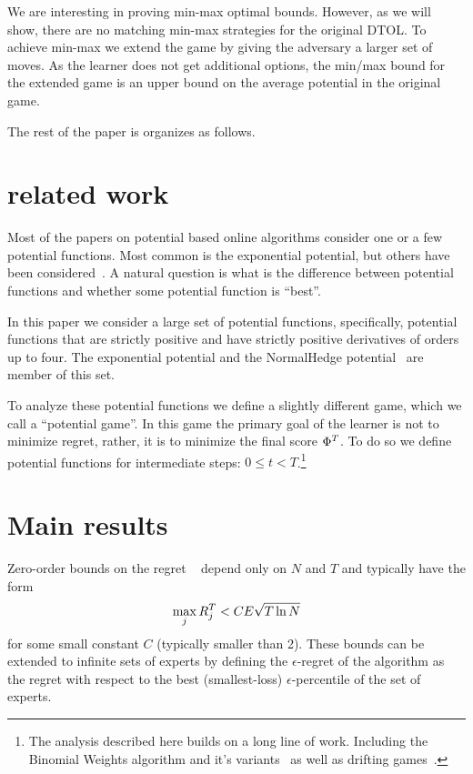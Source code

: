 \documentclass{article}[12pt]
\begin{document}
We are interesting in proving min-max optimal bounds. However, as we
will show, there are no matching min-max strategies for the original
DTOL. To achieve min-max we extend the game by giving the adversary a
larger set of moves. As the learner does not get additional options,
the min/max bound for the extended game is an upper bound on the
average potential in the original game.

The rest of the paper is organizes as follows.

\section{related work}
Most of the papers on potential based online algorithms consider
one or a few potential functions. Most common is the exponential
potential, but others have been considered~\cite{cesa2006prediction}.
A natural question is what is the difference between potential
functions and whether some potential function is ``best''.

In this paper we consider a large set of potential functions,
specifically, potential functions that are strictly positive and have
strictly positive derivatives of orders up to four. The exponential
potential and the NormalHedge potential~\cite{chaudhuri2009parameter,luo2015achieving}
are member of this set. 

To analyze these potential functions we define a slightly different
game, which we call a ``potential game''. In this game the primary
goal of the learner is not to minimize regret, rather, it is to
minimize the final score $\Phi^T$. To do so
we define potential functions for intermediate steps: $0 \leq t
<T$.\footnote{The analysis described here builds on a long line of
  work. Including the Binomial Weights algorithm and it's
  variants~\cite{cesa1996line,abernethy2006continuous,abernethy2008optimal}
  as well as drifting games~\cite{schapire2001drifting,freund2002drifting}.}

\section{Main results}
Zero-order bounds on the regret ~\cite{freund1999adaptive} depend only on $N$
and $T$ and typically have the form
\begin{equation} \label{eqn:0-order-bound}
  \max_j R_j^T < C E \sqrt{T \ln N}
\end{equation}
for some small constant $C$ (typically smaller than 2).
These bounds can be extended to infinite sets of experts by defining
the $\epsilon$-regret of the algorithm as the regret with respect to
the best (smallest-loss) $\epsilon$-percentile of the set of experts.
\end{document}
